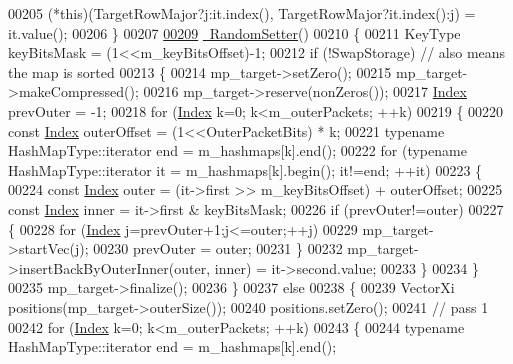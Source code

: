 \begin{DoxyCode}
00205           (*\textcolor{keyword}{this})(TargetRowMajor?j:it.index(), TargetRowMajor?it.index():j) = it.value();
00206     \}
00207 
\hyperlink{class_eigen_1_1_random_setter_a3e4a78672df59ab4dd2799919b431027}{00209}     \hyperlink{class_eigen_1_1_random_setter_a3e4a78672df59ab4dd2799919b431027}{~RandomSetter}()
00210     \{
00211       KeyType keyBitsMask = (1<<m\_keyBitsOffset)-1;
00212       \textcolor{keywordflow}{if} (!SwapStorage) \textcolor{comment}{// also means the map is sorted}
00213       \{
00214         mp\_target->setZero();
00215         mp\_target->makeCompressed();
00216         mp\_target->reserve(nonZeros());
00217         \hyperlink{namespace_eigen_a62e77e0933482dafde8fe197d9a2cfde}{Index} prevOuter = -1;
00218         \textcolor{keywordflow}{for} (\hyperlink{namespace_eigen_a62e77e0933482dafde8fe197d9a2cfde}{Index} k=0; k<m\_outerPackets; ++k)
00219         \{
00220           \textcolor{keyword}{const} \hyperlink{namespace_eigen_a62e77e0933482dafde8fe197d9a2cfde}{Index} outerOffset = (1<<OuterPacketBits) * k;
00221           \textcolor{keyword}{typename} HashMapType::iterator end = m\_hashmaps[k].end();
00222           \textcolor{keywordflow}{for} (\textcolor{keyword}{typename} HashMapType::iterator it = m\_hashmaps[k].begin(); it!=end; ++it)
00223           \{
00224             \textcolor{keyword}{const} \hyperlink{namespace_eigen_a62e77e0933482dafde8fe197d9a2cfde}{Index} outer = (it->first >> m\_keyBitsOffset) + outerOffset;
00225             \textcolor{keyword}{const} \hyperlink{namespace_eigen_a62e77e0933482dafde8fe197d9a2cfde}{Index} inner = it->first & keyBitsMask;
00226             \textcolor{keywordflow}{if} (prevOuter!=outer)
00227             \{
00228               \textcolor{keywordflow}{for} (\hyperlink{namespace_eigen_a62e77e0933482dafde8fe197d9a2cfde}{Index} j=prevOuter+1;j<=outer;++j)
00229                 mp\_target->startVec(j);
00230               prevOuter = outer;
00231             \}
00232             mp\_target->insertBackByOuterInner(outer, inner) = it->second.value;
00233           \}
00234         \}
00235         mp\_target->finalize();
00236       \}
00237       \textcolor{keywordflow}{else}
00238       \{
00239         VectorXi positions(mp\_target->outerSize());
00240         positions.setZero();
00241         \textcolor{comment}{// pass 1}
00242         \textcolor{keywordflow}{for} (\hyperlink{namespace_eigen_a62e77e0933482dafde8fe197d9a2cfde}{Index} k=0; k<m\_outerPackets; ++k)
00243         \{
00244           \textcolor{keyword}{typename} HashMapType::iterator end = m\_hashmaps[k].end();

\end{DoxyCode}
